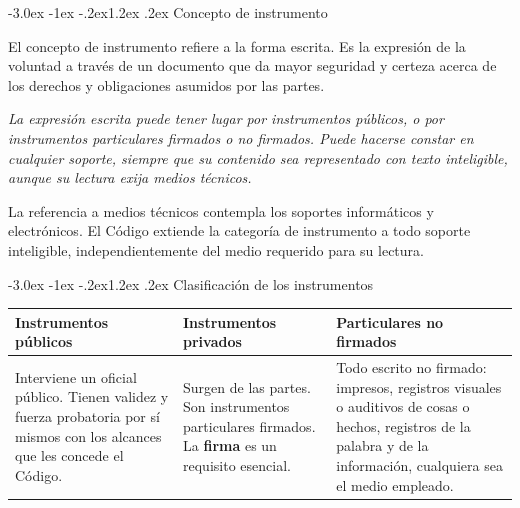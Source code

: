 \documentclass[12pt,oneside]{book}
\makeatletter
\renewcommand\section{\@startsection{section}{1}{\z@}%
  {-3.0ex \@plus -1ex \@minus -.2ex}{1.2ex \@plus .2ex}%
  {\normalfont\large\bfseries\color{acento}}}
\makeatother
\begin{document}
\section{Concepto de instrumento}

El concepto de instrumento refiere a la forma escrita. Es la expresión de la voluntad a través de un documento que da mayor seguridad y certeza acerca de los derechos y obligaciones asumidos por las partes.

\begin{regla}
\textit{La expresión escrita puede tener lugar por instrumentos públicos, o por instrumentos particulares firmados o no firmados. Puede hacerse constar en cualquier soporte, siempre que su contenido sea representado con texto inteligible, aunque su lectura exija medios técnicos.}
\end{regla}

\begin{importante}
La referencia a medios técnicos contempla los soportes informáticos y electrónicos. El Código extiende la categoría de instrumento a todo soporte inteligible, independientemente del medio requerido para su lectura.
\end{importante}

\section{Clasificación de los instrumentos}

\begin{table}[H]
\centering
\begin{tabularx}{\textwidth}{>{\raggedright\arraybackslash}p{}
                              >{\raggedright\arraybackslash}p{}
                              >{\raggedright\arraybackslash}X}
\toprule
\textbf{Instrumentos públicos} & \textbf{Instrumentos privados} & \textbf{Particulares no firmados} \\
\midrule
Interviene un oficial público. Tienen validez y fuerza probatoria por sí mismos con los alcances que les concede el Código. & Surgen de las partes. Son instrumentos particulares firmados. La \textbf{firma} es un requisito esencial. & Todo escrito no firmado: impresos, registros visuales o auditivos de cosas o hechos, registros de la palabra y de la información, cualquiera sea el medio empleado. \\
\bottomrule
\end{tabularx}
\end{table}
\end{document}
